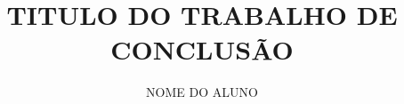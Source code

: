 \documentclass[versao=digital]{tc_ifgoiano_ceres}
\author{NOME DO ALUNO}
\title{TITULO DO TRABALHO DE CONCLUSÃO}
\begin{document}
	
	
	\textual

	
	
	\postextual	
	

	\apendices
	
\end{document}

